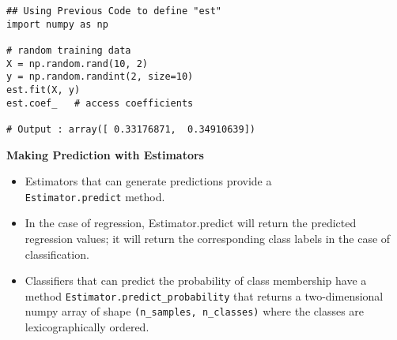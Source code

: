 \documentclass[SKL-MASTER.tex]{subfiles}
\begin{document}
\begin{framed}
\begin{verbatim}
## Using Previous Code to define "est"
import numpy as np

# random training data
X = np.random.rand(10, 2)
y = np.random.randint(2, size=10)
est.fit(X, y)
est.coef_   # access coefficients

# Output : array([ 0.33176871,  0.34910639])
\end{verbatim}
\end{framed}
\newpage
\textbf{Making Prediction with Estimators}
\LARGE
\begin{itemize}
\item Estimators that can generate predictions provide a \\ \texttt{Estimator.predict} method.
\item In the case of regression, Estimator.predict will return the predicted regression values; it will return the corresponding class labels in the case of classification.
\item  Classifiers that can predict the probability of class membership have a method \texttt{Estimator.predict\_probability} that returns a two-dimensional numpy array of shape \texttt{(n\_samples, n\_classes)} where the classes are lexicographically ordered.
\end{itemize}


%
\end{document}
